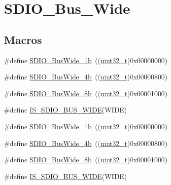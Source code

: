 \hypertarget{group___s_d_i_o___bus___wide}{}\section{S\+D\+I\+O\+\_\+\+Bus\+\_\+\+Wide}
\label{group___s_d_i_o___bus___wide}
\subsection*{Macros}
\begin{DoxyCompactItemize}
\item 
\#define \hyperlink{group___s_d_i_o___bus___wide_ga9c333b57937c5cc0a173a58519f9250a}{S\+D\+I\+O\+\_\+\+Bus\+Wide\+\_\+1b}~((\hyperlink{_p_e___types_8h_a33594304e786b158f3fb30289278f5af}{uint32\+\_\+t})0x00000000)
\item 
\#define \hyperlink{group___s_d_i_o___bus___wide_ga79815d1d798b28a2d3750ad25466ff1b}{S\+D\+I\+O\+\_\+\+Bus\+Wide\+\_\+4b}~((\hyperlink{_p_e___types_8h_a33594304e786b158f3fb30289278f5af}{uint32\+\_\+t})0x00000800)
\item 
\#define \hyperlink{group___s_d_i_o___bus___wide_ga4d864f5c4e1af298146afc1d680081e9}{S\+D\+I\+O\+\_\+\+Bus\+Wide\+\_\+8b}~((\hyperlink{_p_e___types_8h_a33594304e786b158f3fb30289278f5af}{uint32\+\_\+t})0x00001000)
\item 
\#define \hyperlink{group___s_d_i_o___bus___wide_gaa5c6ad922117d5df3213631bf68fde5b}{I\+S\+\_\+\+S\+D\+I\+O\+\_\+\+B\+U\+S\+\_\+\+W\+I\+DE}(W\+I\+DE)
\item 
\#define \hyperlink{group___s_d_i_o___bus___wide_ga9c333b57937c5cc0a173a58519f9250a}{S\+D\+I\+O\+\_\+\+Bus\+Wide\+\_\+1b}~((\hyperlink{_p_e___types_8h_a33594304e786b158f3fb30289278f5af}{uint32\+\_\+t})0x00000000)
\item 
\#define \hyperlink{group___s_d_i_o___bus___wide_ga79815d1d798b28a2d3750ad25466ff1b}{S\+D\+I\+O\+\_\+\+Bus\+Wide\+\_\+4b}~((\hyperlink{_p_e___types_8h_a33594304e786b158f3fb30289278f5af}{uint32\+\_\+t})0x00000800)
\item 
\#define \hyperlink{group___s_d_i_o___bus___wide_ga4d864f5c4e1af298146afc1d680081e9}{S\+D\+I\+O\+\_\+\+Bus\+Wide\+\_\+8b}~((\hyperlink{_p_e___types_8h_a33594304e786b158f3fb30289278f5af}{uint32\+\_\+t})0x00001000)
\item 
\#define \hyperlink{group___s_d_i_o___bus___wide_gaa5c6ad922117d5df3213631bf68fde5b}{I\+S\+\_\+\+S\+D\+I\+O\+\_\+\+B\+U\+S\+\_\+\+W\+I\+DE}(W\+I\+DE)
\end{DoxyCompactItemize}


